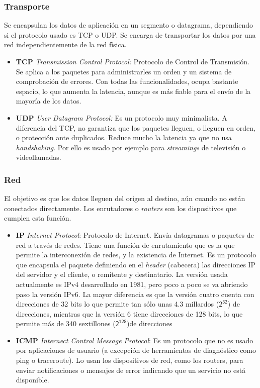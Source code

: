 \documentclass[a4paper, 11pt]{report} %
\begin{document}
\subsubsection{Transporte}
Se encapsulan los datos de aplicación en un segmento o datagrama, dependiendo si el protocolo usado es TCP o UDP. Se encarga de transportar los datos por una red independientemente de la red física.
\begin{itemize}
\item \textbf{TCP} \textit{Transmission Control Protocol:} Protocolo de Control de Transmisión. Se aplica a los paquetes para administrarles un orden y un sistema de comprobación de errores. Con todas las funcionalidades, ocupa bastante espacio, lo que aumenta la latencia, aunque es más fiable para el envío de la mayoría de los datos.
\item \textbf{UDP} \textit{User Datagram Protocol:} Es un protocolo muy minimalista. A diferencia del TCP, no garantiza que los paquetes lleguen, o lleguen en orden, o protección ante duplicados. Reduce mucho la latencia ya que no usa \textit{handshaking}. Por ello es usado por ejemplo para \textit{streamings} de televisión o videollamadas.
\end{itemize}
\subsubsection{Red}
El objetivo es que los datos lleguen del origen al destino, aún cuando no están conectados directamente. Los enrutadores o \textit{routers} son los dispositivos que cumplen esta función.
\begin{itemize}
\item \textbf{IP} \textit{Internet Protocol}: Protocolo de Internet. Envía datagramas o paquetes de red a través de redes. Tiene una función de enrutamiento que es la que permite la interconexión de redes, y la existencia de Internet. Es un protocolo que encapsula el paquete definiendo en el \textit{header} (cabecera) las direcciones IP del servidor y el cliente, o remitente y destinatario. La versión usada actualmente es IPv4 desarrollado en 1981, pero poco a poco se va abriendo paso la versión IPv6. La mayor diferencia es que la versión cuatro cuenta con direcciones de 32 bits lo que permite tan sólo unas 4.3 millardos ($\mathsf{2^{32}}$) de direcciones, mientras que la versión 6 tiene direcciones de 128 bits, lo que permite más de 340 sextillones ($\mathsf{2^{128}}$)de direcciones
\item \textbf{ICMP} \textit{Internect Control Message Protocol}: Es un protocolo que no es usado por aplicaciones de usuario (a excepción de herramientas de diagnóstico como ping o traceroute). Lo usan los dispositivos de red, como los routers, para enviar notificaciones o mensajes de error indicando que un servicio no está disponible.
\end{itemize}
\end{document}
